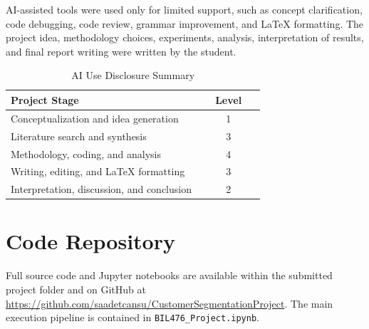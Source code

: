\documentclass[conference]{IEEEtran}
\begin{document}
AI-assisted tools were used only for limited support, such as concept clarification, code debugging, code review, grammar improvement, and LaTeX formatting. 
The project idea, methodology choices, experiments, analysis, interpretation of results, and final report writing were written by the student. 

\begin{table}[htbp]
	\caption{AI Use Disclosure Summary}
	\label{tab:ai_use}
	\centering
	\footnotesize
	\begin{tabular}{|p{0.75\linewidth}|c|}
		\hline
		\textbf{Project Stage} & \textbf{Level} \\
		\hline
		Conceptualization and idea generation & 1 \\
		\hline
		Literature search and synthesis & 3 \\
		\hline
		Methodology, coding, and analysis & 4 \\
		\hline
		Writing, editing, and LaTeX formatting & 3 \\
		\hline
		Interpretation, discussion, and conclusion & 2 \\
		\hline
	\end{tabular}
\end{table}




\newpage	
\appendix

\section{Code Repository}
\label{app:code}

Full source code and Jupyter notebooks are available within the submitted project folder and on GitHub at \url{https://github.com/saadetcansu/CustomerSegmentationProject}. The main execution pipeline is contained in \texttt{BIL476\_Project.ipynb}.
\end{document}
